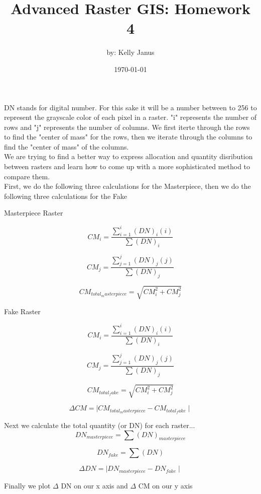 \documentclass[12pt, letterpaper]{article}
\title{Advanced Raster GIS: Homework 4}
\author{by: Kelly Janus}
\date{\today}
\begin{document}
\begin{titlepage}
\maketitle
\end{titlepage}

DN stands for digital number.  For this sake it will be a number between  to 256 to represent the grayscale color of each pixel in a raster. "i" represents the number of rows and "j" represents the number of columns.  We first iterte through the rows to find the "center of mass" for the rows, then we iterate through the columns to find the "center of mass" of the columns.  \\

We are trying to find a better way to express allocation and quantity disribution between rasters and learn how to come up with a more sophisticated method to compare them. \\

First, we do the following three calculations for the Masterpiece, then we do the following three calculations for the Fake \\

\begin{center}

Masterpiece Raster

\end{center}

$$
CM_i = \frac{\sum_{i = 1}^{i}{(DN)_i(i)}}{\sum{(DN)_i}}
$$

$$
CM_j = \frac{\sum_{j = 1}^{j}{(DN)_j(j)}}{\sum{(DN)_j}}
$$

$$
CM_{total_masterpiece} = \sqrt{CM_i^2 + CM_j^2}
$$

\vspace{10mm}

\begin{center}

Fake Raster

\end{center}

$$
CM_i = \frac{\sum_{i = 1}^{i}{(DN)_i(i)}}{\sum{(DN)_i}}
$$

$$
CM_j = \frac{\sum_{j = 1}^{j}{(DN)_j(j)}}{\sum{(DN)_j}}
$$

$$
CM_{total_fake} = \sqrt{CM_i^2 + CM_j^2}
$$

\vspace{10mm}

$$
\Delta CM = \mid CM_{total_masterpiece} - CM_{total_fake} \mid
$$

\vspace{10mm}


Next we calculate the total quantity (or DN) for each raster... \\

$$
DN_{masterpiece} = \sum(DN)_{masterpiece} 
$$

$$
DN_{fake} = \sum(DN) 
$$

$$
\Delta DN = \mid DN_{masterpiece} - DN_{fake} \mid
$$




\vspace{10mm}

Finally we plot $\Delta$ DN on our x axis and $\Delta$ CM on our y axis 
\end{document}
